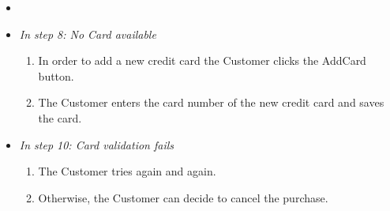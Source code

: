 \begin{description}[font=\normalfont\itshape]
\item[Alternative or Exceptional Processes]
\begin{itemize}[leftmargin=.3cm]
\item[]
\item \textit{In step 8: No Card available}
	\begin{enumerate}[leftmargin=.5cm]
		\item In order to add a new credit card the Customer clicks the AddCard button.
		\item The Customer enters the card number of the new credit card and saves the card.
	\end{enumerate}
	
	\item \textit{In step 10: Card validation fails}
	\begin{enumerate}[leftmargin=.5cm]
		\item The Customer tries again and again.
		\item Otherwise, the Customer can decide to cancel the purchase.
	\end{enumerate}
\end{itemize}
\end{description}



